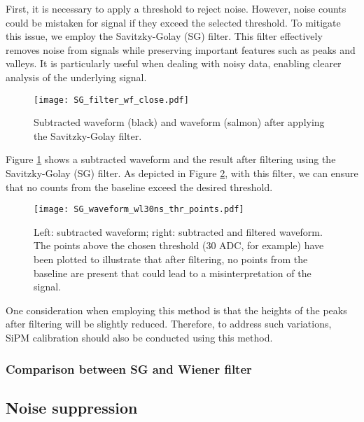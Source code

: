 \documentclass[11pt,a4paper,english,oneside, pdf]{article}
\begin{document}
	First, it is necessary to apply a threshold to reject noise. However, noise counts could be mistaken for signal if they exceed the selected threshold. To mitigate this issue, we employ the Savitzky-Golay (SG) filter. This filter effectively removes noise from signals while preserving important features such as peaks and valleys. It is particularly useful when dealing with noisy data, enabling clearer analysis of the underlying signal.
	
	\begin{figure}[!h]
		\begin{center}
			\texttt{[image: SG\_filter\_wf\_close.pdf]}
			\caption{Subtracted waveform (black) and waveform (salmon) after applying the Savitzky-Golay filter.}
			\label{fig:SG_waveform}
		\end{center}
	\end{figure}
	
	Figure \ref{fig:SG_waveform} shows a subtracted waveform and the result after filtering using the Savitzky-Golay (SG) filter. As depicted in Figure \ref{fig:SG_waveform_thr}, with this filter, we can ensure that no counts from the baseline exceed the desired threshold.
	
	\begin{figure}[!h]
		\begin{center}
			\texttt{[image: SG\_waveform\_wl30ns\_thr\_points.pdf]}
			\caption{Left: subtracted waveform; right: subtracted and filtered waveform. The points above the chosen threshold (30 ADC, for example) have been plotted to illustrate that after filtering, no points from the baseline are present that could lead to a misinterpretation of the signal.}
			\label{fig:SG_waveform_thr}
		\end{center}
	\end{figure}
	
	One consideration when employing this method is that the heights of the peaks after filtering will be slightly reduced. Therefore, to address such variations, SiPM calibration should also be conducted using this method.
	
	\subsubsection{Comparison between SG and Wiener filter}
	
	
	\subsection{Noise suppression}
	\label{noise_suppression_sec}
	
\end{document}
